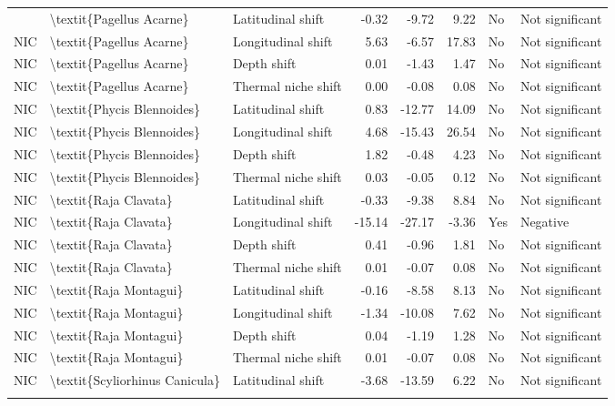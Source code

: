 \begin{longtable}[t]{lllrrrll}
{{NIC & \textbackslash{}textit\{Pagellus Acarne\} & Latitudinal shift & -0.32 & -9.72 & 9.22 & No & Not significant\\
NIC & \textbackslash{}textit\{Pagellus Acarne\} & Longitudinal shift & 5.63 & -6.57 & 17.83 & No & Not significant\\
NIC & \textbackslash{}textit\{Pagellus Acarne\} & Depth shift & 0.01 & -1.43 & 1.47 & No & Not significant\\
NIC & \textbackslash{}textit\{Pagellus Acarne\} & Thermal niche shift & 0.00 & -0.08 & 0.08 & No & Not significant\\
\addlinespace
NIC & \textbackslash{}textit\{Phycis Blennoides\} & Latitudinal shift & 0.83 & -12.77 & 14.09 & No & Not significant\\
NIC & \textbackslash{}textit\{Phycis Blennoides\} & Longitudinal shift & 4.68 & -15.43 & 26.54 & No & Not significant\\
NIC & \textbackslash{}textit\{Phycis Blennoides\} & Depth shift & 1.82 & -0.48 & 4.23 & No & Not significant\\
NIC & \textbackslash{}textit\{Phycis Blennoides\} & Thermal niche shift & 0.03 & -0.05 & 0.12 & No & Not significant\\
NIC & \textbackslash{}textit\{Raja Clavata\} & Latitudinal shift & -0.33 & -9.38 & 8.84 & No & Not significant\\
\addlinespace
NIC & \textbackslash{}textit\{Raja Clavata\} & Longitudinal shift & -15.14 & -27.17 & -3.36 & Yes & Negative\\
NIC & \textbackslash{}textit\{Raja Clavata\} & Depth shift & 0.41 & -0.96 & 1.81 & No & Not significant\\
NIC & \textbackslash{}textit\{Raja Clavata\} & Thermal niche shift & 0.01 & -0.07 & 0.08 & No & Not significant\\
NIC & \textbackslash{}textit\{Raja Montagui\} & Latitudinal shift & -0.16 & -8.58 & 8.13 & No & Not significant\\
NIC & \textbackslash{}textit\{Raja Montagui\} & Longitudinal shift & -1.34 & -10.08 & 7.62 & No & Not significant\\
\addlinespace
NIC & \textbackslash{}textit\{Raja Montagui\} & Depth shift & 0.04 & -1.19 & 1.28 & No & Not significant\\
NIC & \textbackslash{}textit\{Raja Montagui\} & Thermal niche shift & 0.01 & -0.07 & 0.08 & No & Not significant\\
NIC & \textbackslash{}textit\{Scyliorhinus Canicula\} & Latitudinal shift & -3.68 & -13.59 & 6.22 & No & Not significant\\
}}
\end{longtable}
